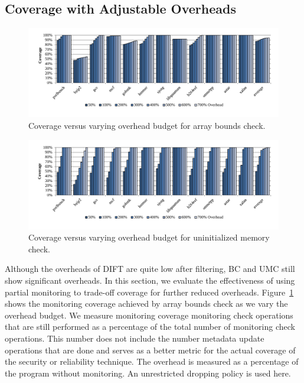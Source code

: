\subsection{Coverage with Adjustable Overheads}

\begin{figure}
  \begin{center}
    \includegraphics[width=\linewidth]{figs/data_bc_sweep.pdf}
    \vspace{-0.4in}
    \caption{Coverage versus varying overhead budget for array bounds check.}
    \label{fig:evaluation.bc_sweep}
    \vspace{-0.2in}
  \end{center}
\end{figure}

\begin{figure}
  \begin{center}
    \includegraphics[width=\linewidth]{figs/data_umc_sweep.pdf}
    \vspace{-0.4in}
    \caption{Coverage versus varying overhead budget for uninitialized memory check.}
    \label{fig:evaluation.umc_sweep}
    \vspace{-0.1in}
  \end{center}
\end{figure}

Although the overheads of DIFT are quite low after filtering, BC and UMC still
show significant overheads. In this section, we evaluate the effectiveness of
using partial monitoring to trade-off coverage for further reduced overheads.
Figure~\ref{fig:evaluation.bc_sweep} shows the monitoring coverage achieved by
array bounds check as we vary the overhead budget. We measure monitoring
coverage monitoring check operations that are still performed as a percentage
of the total number of monitoring check operations. This number does not
include the number metadata update operations that are done and serves as a
better metric for the actual coverage of the security or reliability technique.
The overhead is measured as a percentage of the program without monitoring. An
unrestricted dropping policy is used here.

